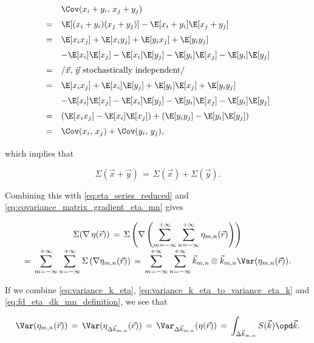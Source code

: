 {\begin{equation}
\renewcommand*{\arraystretch}{1.5}
\begin{array}{cl}
  & \Cov(x_i+y_i,\,x_j+y_j) \\
= & \E[(x_i+y_i)(x_j+y_j)] - \E[x_i+y_i]\E[x_j+y_j] \\
= & \E[x_i x_j] + \E[x_i y_j] + \E[y_i x_j] + \E[y_i y_j] \\
  & - \E[x_i]\E[x_j] - \E[x_i]\E[y_j] - \E[y_i]\E[x_j] - \E[y_i]\E[y_j] \\
= & \left/ \vec{x},\, \vec{y}\ \text{stochastically independent}\right/ \\
= & \E[x_i x_j] + \E[x_i]\E[y_j] + \E[y_i]\E[x_j] + \E[y_i y_j] \\
  & - \E[x_i]\E[x_j] - \E[x_i]\E[y_j] - \E[y_i]\E[x_j] - \E[y_i]\E[y_j] \\
= & (\E[x_i x_j] - \E[x_i]\E[x_j]) + (\E[y_i y_j] - \E[y_i]\E[y_j]) \\
= & \Cov(x_i,\,x_j) + \Cov(y_i,\,y_j),
\end{array}
\end{equation}

which implies that

\begin{equation} \label{eq:covariance_matrix_sum}
\Sigma(\vec{x} + \vec{y}) \,=\, \Sigma(\vec{x}) + \Sigma(\vec{y}).
\end{equation}

Combining this with \eqref{eq:eta_series_reduced} and \eqref{eq:covariance_matrix_gradient_eta_mn} gives

\begin{equation} \label{eq:covariance_matrix_gradient_eta}
\renewcommand*{\arraystretch}{2}
\begin{array}{c}
\displaystyle \Sigma(\nabla\,\eta(\vec{r})) \,=\, \Sigma\left(\nabla\left(\sum_{m=-\infty}^{+\infty}\sum_{n=-\infty}^{+\infty} \eta_{m,n}(\vec{r})\right)\right) \\
\displaystyle =\, \sum_{m=-\infty}^{+\infty}\sum_{n=-\infty}^{+\infty}\Sigma\left(\nabla\eta_{m,n}(\vec{r})\right) \,=\, \sum_{m=-\infty}^{+\infty}\sum_{n=-\infty}^{+\infty}\vec{k}_{m,n}\otimes\vec{k}_{m,n} \Var(\eta_{m,n}(\vec{r})).
\end{array}
\end{equation}

If we combine \eqref{eq:variance_k_eta}, \eqref{eq:variance_k_eta_to_variance_eta_k} and \eqref{eq:fd_eta_dk_mn_definition}, we see that

\begin{equation}
\Var(\eta_{m,n}(\vec{r})) \,=\, \Var(\eta_{\Delta\vec{k}_{m,n}}(\vec{r})) \,=\, \Var_{\Delta\vec{k}_{m,n}}(\eta(\vec{r})) \,=\, \int_{\Delta\vec{k}_{m,n}}S(\vec{k})\opd\vec{k}.
\end{equation}

}
